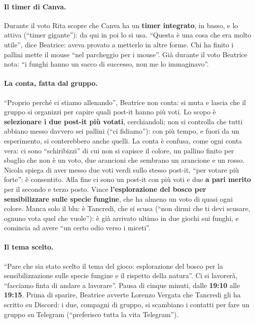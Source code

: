 \paragraph{Il timer di Canva.} Durante il voto Rita scopre che Canva ha un
\textbf{timer integrato}, in basso, e lo attiva (``timer gigante''): da qui in poi lo
si usa. ``Questa è una cosa che era molto utile'', dice Beatrice: aveva provato a
metterlo in altre forme. Chi ha finito i pallini mette il mouse ``nel parcheggio per i
mouse''. Già durante il voto Beatrice nota: ``i funghi hanno un sacco di successo,
non me lo immaginavo''.

\paragraph{La conta, fatta dal gruppo.} ``Proprio perché ci stiamo allenando'',
Beatrice non conta: si muta e lascia che il gruppo si organizzi per capire quali
post-it hanno più voti. Lo scopo è \textbf{selezionare i due post-it più votati},
cerchiandoli; non si controlla che tutti abbiano messo davvero sei pallini (``ci
fidiamo''): con più tempo, e fuori da un esperimento, si conterebbero anche quelli. La
conta è confusa, come ogni conta vera: ci sono ``schiribizzi'' di cui non si capisce
il colore, un pallino finito per sbaglio che non è un voto, due arancioni che
sembrano un arancione e un rosso. Nicola spiega di aver messo due voti verdi sullo
stesso post-it, ``per votare più forte'': è consentito. Alla fine ci sono un post-it
con più voti e due \textbf{a pari merito} per il secondo e terzo posto. Vince
\textbf{l'esplorazione del bosco per sensibilizzare sulle specie fungine}, che ha
almeno un voto di quasi ogni colore. Manca solo il blu: è Tancredi, che si scusa
(``non dirmi che ti devi scusare, ognuno vota quel che vuole''): è già arrivato
ultimo in due giochi sui funghi, e comincia ad avere ``un certo odio verso i
miceti''.

\paragraph{Il tema scelto.} ``Pare che sia stato scelto il tema del gioco:
esplorazione del bosco per la sensibilizzazione sulle specie fungine e il rispetto
della natura''. Ci si lavorerà, ``facciamo finta di andare a lavorare''. Pausa di
cinque minuti, dalle \textbf{19:10} alle \textbf{19:15}. Prima di sparire, Beatrice
avverte Lorenzo Vergata che Tancredi gli ha scritto su Discord: i due, compagni di
gruppo, si scambiano i contatti per fare un gruppo su Telegram (``preferisco tutta la
vita Telegram'').

